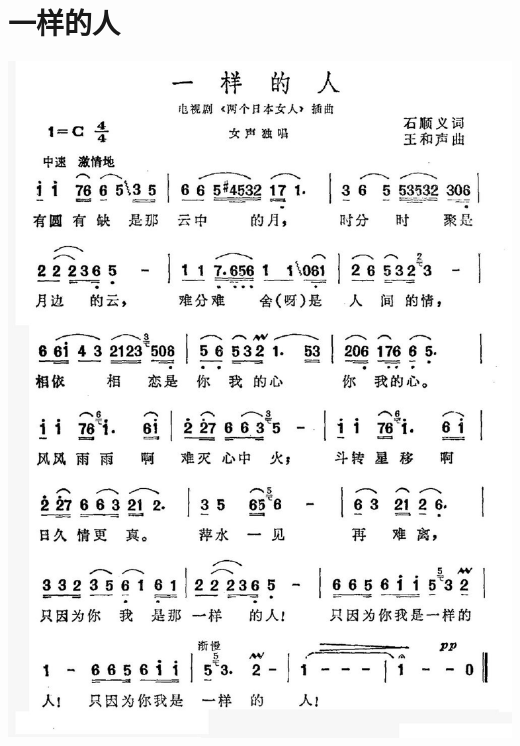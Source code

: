 \documentclass[cn,pad,chinese,chinesefont=nofont]{elegantbook}
\begin{document}
\section{一样的人}
\includegraphics[height=\textheight]{dongxiao/日本-一样的人.jpg}
\end{document}
